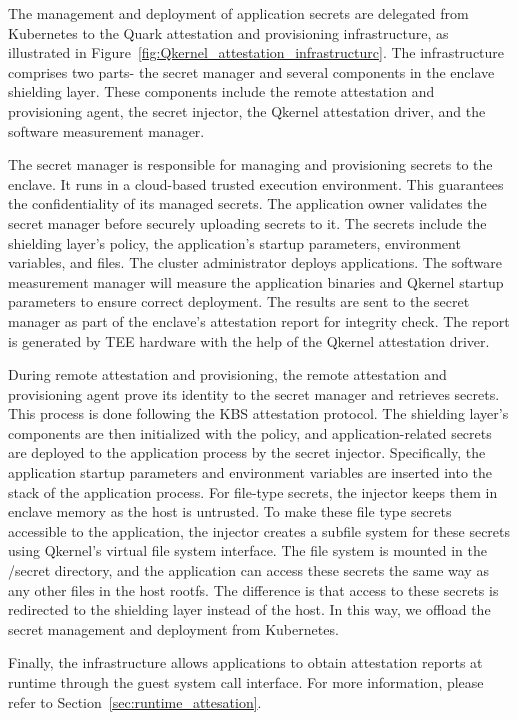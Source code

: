 The management and deployment of application secrets are delegated from Kubernetes to the Quark attestation and provisioning infrastructure, as illustrated in Figure~\ref{fig:Qkernel_attestation_infrastructurc}. The infrastructure comprises two 
parts- the secret manager and several components in the enclave shielding layer. These components include the remote attestation and provisioning agent, the secret injector, the Qkernel attestation driver, and the software measurement manager.

The secret manager is responsible for managing and provisioning secrets to the enclave. It runs in a cloud-based trusted execution environment. This guarantees the confidentiality of its managed secrets. The application owner validates the secret 
manager before securely uploading secrets to it. The secrets include the shielding layer's policy, the application's startup parameters, environment variables, and files. The cluster administrator deploys applications. The software measurement 
manager will measure the application binaries and Qkernel startup parameters to ensure correct deployment. The results are sent to the secret manager as part of the enclave's attestation report for integrity check. The report is generated by TEE 
hardware with the help of the Qkernel attestation driver.

During remote attestation and provisioning, the remote attestation and provisioning agent prove its identity to the secret manager and retrieves secrets. This process is done following the KBS attestation protocol. The shielding layer's components 
are then initialized with the policy, and application-related secrets are deployed to the application process by the secret injector. Specifically, the application startup parameters and environment variables are inserted into the stack of the 
application process. For file-type secrets, the injector keeps them in enclave memory as the host is untrusted. To make these file type secrets accessible to the application, the injector creates a subfile system for these secrets using Qkernel's 
virtual file system interface. The file system is mounted in the /secret directory, and the application can access these secrets the same way as any other files in the host rootfs. The difference is that access to these secrets is redirected to the shielding layer instead of the host. In this way, we offload the secret management and deployment from Kubernetes.

Finally, the infrastructure allows applications to obtain attestation reports at runtime through the guest system call interface. For more information, please refer to Section~\ref*{sec:runtime_attesation}.


